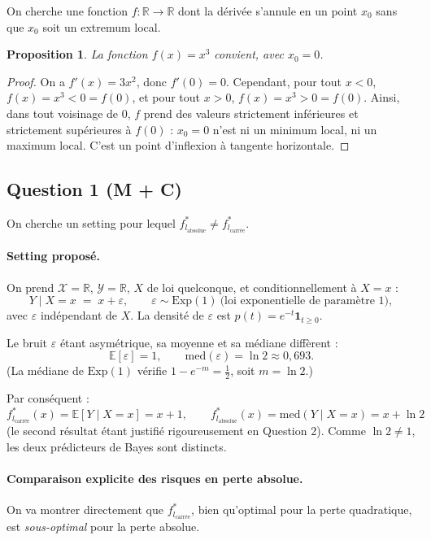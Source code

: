 \documentclass[11pt]{article}
\newtheorem{proposition}{Proposition}
\theoremstyle{remark}
\newcommand{\X}{\mathcal{X}}
\newcommand{\Y}{\mathcal{Y}}
\newcommand{\E}{\mathbb{E}}
\newcommand{\R}{\mathbb{R}}
\begin{document}
On cherche une fonction $f : \R \to \R$ dont la dérivée s'annule en un point $x_0$ sans que $x_0$ soit un extremum local.

\begin{proposition}
La fonction $f(x) = x^3$ convient, avec $x_0 = 0$.
\end{proposition}

\begin{proof}
On a $f'(x) = 3x^2$, donc $f'(0) = 0$. Cependant, pour tout $x < 0$, $f(x) = x^3 < 0 = f(0)$, et pour tout $x > 0$, $f(x) = x^3 > 0 = f(0)$. Ainsi, dans tout voisinage de $0$, $f$ prend des valeurs strictement inférieures et strictement supérieures à $f(0)$ : $x_0=0$ n'est ni un minimum local, ni un maximum local. C'est un point d'inflexion à tangente horizontale.
\end{proof}


\subsection*{Question 1 (M + C)}

On cherche un setting pour lequel $f^*_{l_{\text{absolue}}} \neq f^*_{l_{\text{carrée}}}$.

\paragraph{Setting proposé.}
On prend $\X = \R$, $\Y = \R$, $X$ de loi quelconque, et conditionnellement à $X = x$ :
\[
  Y \mid X = x \;=\; x + \varepsilon, \qquad \varepsilon \sim \mathrm{Exp}(1) \ \text{(loi exponentielle de paramètre 1)},
\]
avec $\varepsilon$ indépendant de $X$. La densité de $\varepsilon$ est $p(t) = e^{-t}\mathbf{1}_{t \geq 0}$.

Le bruit $\varepsilon$ étant asymétrique, sa moyenne et sa médiane diffèrent :
\[
  \E[\varepsilon] = 1, \qquad \mathrm{med}(\varepsilon) = \ln 2 \approx 0{,}693.
\]
(La médiane de $\mathrm{Exp}(1)$ vérifie $1-e^{-m}=\tfrac12$, soit $m = \ln 2$.)

Par conséquent :
\[
  f^*_{l_{\text{carrée}}}(x) = \E[Y\mid X=x] = x + 1, \qquad
  f^*_{l_{\text{absolue}}}(x) = \mathrm{med}(Y \mid X=x) = x + \ln 2
\]
(le second résultat étant justifié rigoureusement en Question 2). Comme $\ln 2 \neq 1$, les deux prédicteurs de Bayes sont distincts.

\paragraph{Comparaison explicite des risques en perte absolue.}
On va montrer directement que $f^*_{l_{\text{carrée}}}$, bien qu'optimal pour la perte quadratique, est \emph{sous-optimal} pour la perte absolue.
\end{document}
